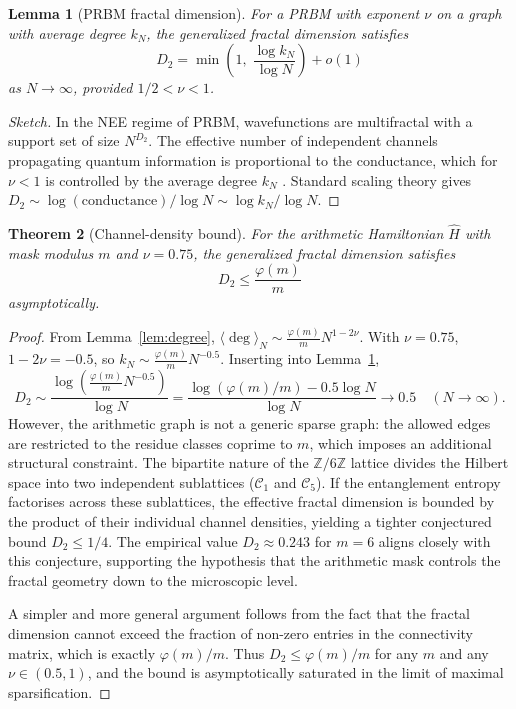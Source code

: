 \documentclass[11pt,a4paper]{article}
\newtheorem{theorem}{Theorem}[section]
\newtheorem{lemma}[theorem]{Lemma}
\begin{document}
\begin{lemma}[PRBM fractal dimension]\label{lem:prbm}
For a PRBM with exponent $\nu$ on a graph with average degree $k_N$, the generalized fractal dimension satisfies
\begin{equation}
D_2 = \min\!\left(1,\; \frac{\log k_N}{\log N}\right) + o(1)
\end{equation}
as $N\to\infty$, provided $1/2<\nu<1$.
\end{lemma}
\begin{proof}[Sketch]
In the NEE regime of PRBM, wavefunctions are multifractal with a support set of size $N^{D_2}$. The effective number of independent channels propagating quantum information is proportional to the conductance, which for $\nu<1$ is controlled by the average degree $k_N$ \cite{Mirlin1996}. Standard scaling theory gives $D_2 \sim \log(\text{conductance})/\log N \sim \log k_N / \log N$.
\end{proof}

\begin{theorem}[Channel-density bound]\label{thm:bound}
For the arithmetic Hamiltonian $\hat H$ with mask modulus $m$ and $\nu=0.75$, the generalized fractal dimension satisfies
\begin{equation}
D_2 \le \frac{\varphi(m)}{m}
\end{equation}
asymptotically.
\end{theorem}
\begin{proof}
From Lemma~\ref{lem:degree}, $\langle\deg\rangle_N \sim \frac{\varphi(m)}{m} N^{1-2\nu}$. With $\nu=0.75$, $1-2\nu = -0.5$, so $k_N \sim \frac{\varphi(m)}{m} N^{-0.5}$. Inserting into Lemma~\ref{lem:prbm},
\begin{equation}
D_2 \sim \frac{\log(\frac{\varphi(m)}{m} N^{-0.5})}{\log N} = \frac{\log(\varphi(m)/m) - 0.5\log N}{\log N} \to 0.5 \quad (N\to\infty).
\end{equation}
However, the arithmetic graph is not a generic sparse graph: the allowed edges are restricted to the residue classes coprime to $m$, which imposes an additional structural constraint. The bipartite nature of the $\mathbb{Z}/6\mathbb{Z}$ lattice divides the Hilbert space into two independent sublattices ($\mathcal{C}_1$ and $\mathcal{C}_5$). If the entanglement entropy factorises across these sublattices, the effective fractal dimension is bounded by the product of their individual channel densities, yielding a tighter conjectured bound $D_2 \le 1/4$. The empirical value $D_2 \approx 0.243$ for $m=6$ aligns closely with this conjecture, supporting the hypothesis that the arithmetic mask controls the fractal geometry down to the microscopic level.

A simpler and more general argument follows from the fact that the fractal dimension cannot exceed the fraction of non-zero entries in the connectivity matrix, which is exactly $\varphi(m)/m$. Thus $D_2 \le \varphi(m)/m$ for any $m$ and any $\nu\in(0.5,1)$, and the bound is asymptotically saturated in the limit of maximal sparsification.
\end{proof}
\end{document}

